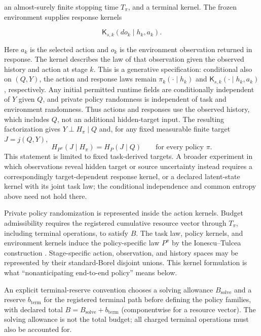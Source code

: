 \documentclass[10pt]{article} %
\providecommand{\1}{\mathbf{1}}  %
\theoremstyle{remark}
\theoremstyle{definition}
\begin{document}
an almost-surely finite stopping time $T_\pi$, and a terminal kernel. The frozen environment supplies response kernels

\begin{equation}
\mathsf K_{s,k}(do_k\mid h_k,a_k).
\label{eq:observed-history-response-kernel}
\end{equation}

Here $a_k$ is the selected action and $o_k$ is the environment
observation returned in response. The kernel describes the law of that
observation given the observed history and action at stage $k$.
This is a generative specification: conditional also on $(Q,Y)$, the
action and response laws remain $\pi_k(\cdot\mid h_k)$ and
$\mathsf K_{s,k}(\cdot\mid h_k,a_k)$, respectively. Any initial permitted
runtime fields are conditionally independent of $Y$ given $Q$, and
private policy randomness is independent of task and environment
randomness. Thus actions and responses use the observed history, which
includes $Q$, not an additional hidden-target input. The resulting factorization gives $Y\perp H_\pi\mid Q$ and, for
any fixed measurable finite target $J=j(Q,Y)$,
\[
H_{P^\pi}(J\mid H_\pi)=H_P(J\mid Q)
\qquad\text{for every policy }\pi.
\]
This statement is limited to fixed task-derived targets. A broader
experiment in which observations reveal hidden target or source
uncertainty instead requires a correspondingly target-dependent response
kernel, or a declared latent-state kernel with its joint task law; the
conditional independence and common entropy above need not hold there.

Private policy randomization is represented inside the action kernels. Budget admissibility requires the registered cumulative resource vector through $T_\pi$, including terminal operations, to satisfy $B$. The task law, policy kernels, and environment kernels induce the
policy-specific law $P^\pi$ by the Ionescu--Tulcea construction
\citep[Chapter~8]{kallenberg2021foundations}. Stage-specific action, observation, and history spaces may be represented by their standard-Borel disjoint unions. This kernel formulation is what ``nonanticipating end-to-end policy'' means below.

An explicit terminal-reserve convention chooses a solving allowance $B_{\mathrm{solve}}$ and a reserve $b_{\mathrm{term}}$ for the registered terminal path before defining the policy families, with declared total $B=B_{\mathrm{solve}}+b_{\mathrm{term}}$ (componentwise for a resource vector). The solving allowance is not the total budget; all charged terminal operations must also be accounted for.
\end{document}
